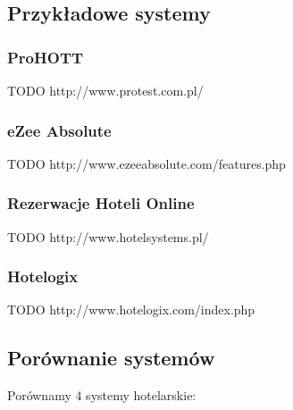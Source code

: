 \documentclass[a4paper,onecolumn,oneside,11pt,wide,floatssmall]{mwrep}
\theoremstyle{definition}
\theoremstyle{plain}%
\theoremstyle{remark}
\begin{document}
\subsection{Przykładowe systemy}

\subsubsection{ProHOTT}
TODO  http://www.protest.com.pl/

\subsubsection{eZee Absolute}
TODO 
http://www.ezeeabsolute.com/features.php

\subsubsection{Rezerwacje Hoteli Online}
TODO http://www.hotelsystems.pl/

\subsubsection{Hotelogix}
TODO http://www.hotelogix.com/index.php

\subsection{Porównanie systemów}
Porównamy 4 systemy hotelarskie:
\end{document}
